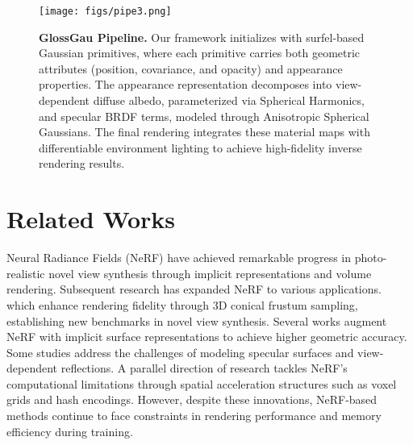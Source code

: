 
\begin{figure*}[t]
    \centering
    \texttt{[image: figs/pipe3.png]}
    \vspace{-3ex}
    \caption{\textbf{GlossGau Pipeline.} Our framework initializes with surfel-based Gaussian primitives, where each primitive carries both geometric attributes (position, covariance, and opacity) and appearance properties. The appearance representation decomposes into view-dependent diffuse albedo, parameterized via Spherical Harmonics, and specular BRDF terms, modeled through Anisotropic Spherical Gaussians. The final rendering integrates these material maps with differentiable environment lighting to achieve high-fidelity inverse rendering results.
    }
    \label{fig:pipe}
    \vspace{-2ex}
\end{figure*}



\section{Related Works}
\label{sec:related}
Neural Radiance Fields (NeRF) \cite{mildenhall2020nerf} have achieved remarkable progress in photo-realistic novel view synthesis through implicit representations and volume rendering. Subsequent research has expanded NeRF to various applications. \cite{barron2021mip, barron2022mip} which enhance rendering fidelity through 3D conical frustum sampling, establishing new benchmarks in novel view synthesis. Several works \cite{oechsle2021unisurf, yariv2021volume, wang2021neus, yu2022monosdf} augment NeRF with implicit surface representations to achieve higher geometric accuracy. Some studies \cite{srinivasan2021nerv, zhang2021nerfactor, yao2022neilf, verbin2022ref} address the challenges of modeling specular surfaces and view-dependent reflections. A parallel direction of research \cite{muller2022instant, fridovich2022plenoxels, liu2020neural, chen2022tensorf, garbin2021fastnerf, sun2022direct} tackles NeRF's computational limitations through spatial acceleration structures such as voxel grids and hash encodings. However, despite these innovations, NeRF-based methods  continue to face constraints in rendering performance and memory efficiency during training.

